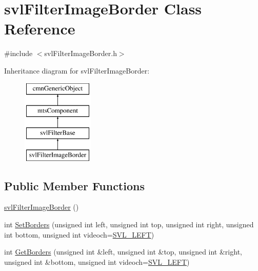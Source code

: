 \hypertarget{classsvl_filter_image_border}{\section{svl\-Filter\-Image\-Border Class Reference}
\label{classsvl_filter_image_border}
}


{\ttfamily \#include $<$svl\-Filter\-Image\-Border.\-h$>$}

Inheritance diagram for svl\-Filter\-Image\-Border\-:\begin{figure}[H]
\begin{center}
\leavevmode
\includegraphics[height=4.000000cm]{d8/d80/classsvl_filter_image_border}
\end{center}
\end{figure}
\subsection*{Public Member Functions}
\begin{DoxyCompactItemize}
\item 
\hyperlink{classsvl_filter_image_border_ac3e25f1c2c6d097787dd26252fd31dc9}{svl\-Filter\-Image\-Border} ()
\item 
int \hyperlink{classsvl_filter_image_border_a849e9326120136f86a5eb2aa21a902bb}{Set\-Borders} (unsigned int left, unsigned int top, unsigned int right, unsigned int bottom, unsigned int videoch=\hyperlink{svl_definitions_8h_ab9fec7615f19c8df2919eebcab0b187f}{S\-V\-L\-\_\-\-L\-E\-F\-T})
\item 
int \hyperlink{classsvl_filter_image_border_af3fb67178868454fcc855c8fe9d31505}{Get\-Borders} (unsigned int \&left, unsigned int \&top, unsigned int \&right, unsigned int \&bottom, unsigned int videoch=\hyperlink{svl_definitions_8h_ab9fec7615f19c8df2919eebcab0b187f}{S\-V\-L\-\_\-\-L\-E\-F\-T})
\end{DoxyCompactItemize}
